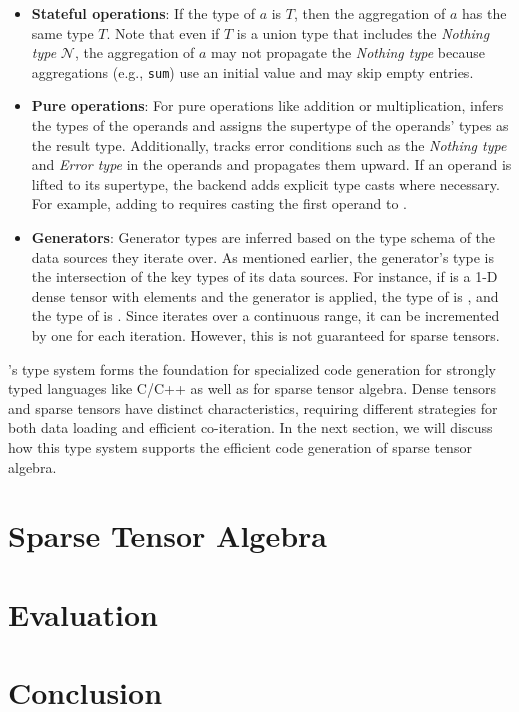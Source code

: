 \documentclass[acmsmall,nonacm]{acmart}\settopmatter{printfolios=true,printccs=false,printacmref=false}
\newcommand{\rhyme}{\text{Rhyme}\xspace}
\begin{document}
\begin{itemize} \item \textbf{Stateful operations}: If the type of $a$ is $T$, then the aggregation of $a$ has the same type $T$. Note that even if $T$ is a union type that includes the \emph{Nothing type} $\mathcal{N}$, the aggregation of $a$ may not propagate the \emph{Nothing type} because aggregations (e.g., \texttt{sum}) use an initial value and may skip empty entries.

\item \textbf{Pure operations}: For pure operations like addition or multiplication, \rhyme infers the types of the operands and assigns the supertype of the operands' types as the result type. Additionally, \rhyme tracks error conditions such as the \emph{Nothing type} and \emph{Error type} in the operands and propagates them upward. If an operand is lifted to its supertype, the backend adds explicit type casts where necessary. For example, adding  to  requires casting the first operand to .

\item \textbf{Generators}: Generator types are inferred based on the type schema of the data sources they iterate over. As mentioned earlier, the generator's type is the intersection of the key types of its data sources. For instance, if  is a 1-D dense tensor with  elements and the generator \inline{*} is applied, the type of \inline{*} is , and the type of  is . Since \inline{*} iterates over a continuous range, it can be incremented by one for each iteration. However, this is not guaranteed for sparse tensors. \end{itemize}\par

\rhyme's type system forms the foundation for specialized code generation for strongly typed languages like C/C++ as well as for sparse tensor algebra. Dense tensors and sparse tensors have distinct characteristics, requiring different strategies for both data loading and efficient co-iteration. In the next section, we will discuss how this type system supports the efficient code generation of sparse tensor algebra.
\section{Sparse Tensor Algebra}\label{sparse}
\section{Evaluation}\label{evaluation}
\section{Conclusion}\label{conclusion}


\end{document}
